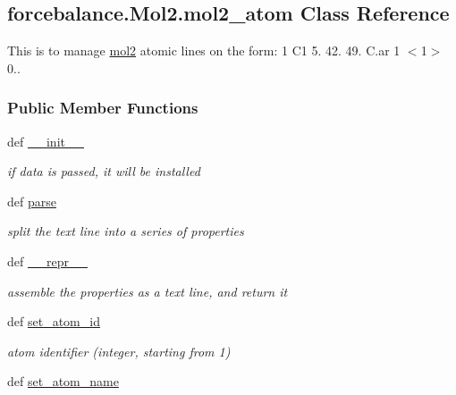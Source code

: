 \hypertarget{classforcebalance_1_1Mol2_1_1mol2__atom}{\subsection{forcebalance.\-Mol2.\-mol2\-\_\-atom Class Reference}
\label{classforcebalance_1_1Mol2_1_1mol2__atom}
}


This is to manage \hyperlink{classforcebalance_1_1Mol2_1_1mol2}{mol2} atomic lines on the form\-: 1 C1 5. 42. 49. C.\-ar 1 $<$1$>$ 0..  


\subsubsection*{Public Member Functions}
\begin{DoxyCompactItemize}
\item 
def \hyperlink{classforcebalance_1_1Mol2_1_1mol2__atom_a1d745e4db9ba351cb8e4e53bf544132c}{\-\_\-\-\_\-init\-\_\-\-\_\-}
\begin{DoxyCompactList}\small\item\em if data is passed, it will be installed \end{DoxyCompactList}\item 
def \hyperlink{classforcebalance_1_1Mol2_1_1mol2__atom_a29aaa00b8fa91f4d18cef387622d339d}{parse}
\begin{DoxyCompactList}\small\item\em split the text line into a series of properties \end{DoxyCompactList}\item 
def \hyperlink{classforcebalance_1_1Mol2_1_1mol2__atom_a2e0ecf1c6da8fde8ab146d4341ac1341}{\-\_\-\-\_\-repr\-\_\-\-\_\-}
\begin{DoxyCompactList}\small\item\em assemble the properties as a text line, and return it \end{DoxyCompactList}\item 
def \hyperlink{classforcebalance_1_1Mol2_1_1mol2__atom_a1af054109bd2d27c29e89b5da0f70920}{set\-\_\-atom\-\_\-id}
\begin{DoxyCompactList}\small\item\em atom identifier (integer, starting from 1) \end{DoxyCompactList}\item 
def \hyperlink{classforcebalance_1_1Mol2_1_1mol2__atom_a4d57220ec5b591ad018112d600d4cc8b}{set\-\_\-atom\-\_\-name}

\end{DoxyCompactItemize}
